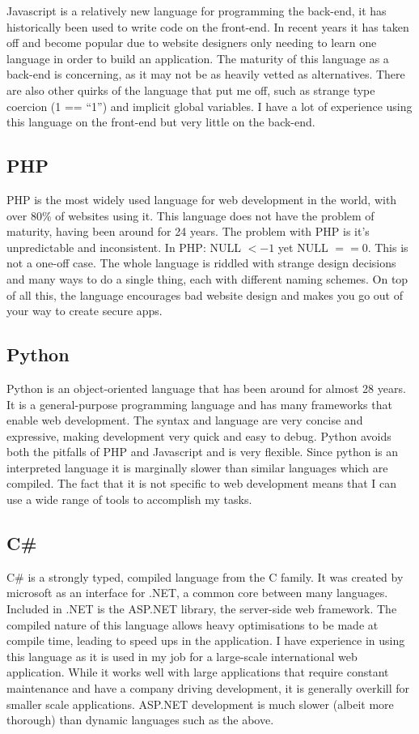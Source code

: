 \documentclass[a4paper,oneside,12pt,draft]{report}
\begin{document}
	Javascript is a relatively new language for programming the back-end, it has historically been used to write code on the front-end. In recent years it has taken off and become popular due to website designers only needing to learn one language in order to build an application. The maturity of this language as a back-end is concerning, as it may not be as heavily vetted as alternatives. There are also other quirks of the language that put me off, such as strange type coercion (1 == “1”) and implicit global variables. I have a lot of experience using this language on the front-end but very little on the back-end.

	\subsection{PHP}
	PHP is the most widely used language for web development in the world, with over 80\% of websites using it. This language does not have the problem of maturity, having been around for 24 years. The problem with PHP is it’s unpredictable and inconsistent. In PHP: NULL \(< -1\) yet NULL \(== 0\). This is not a one-off case. The whole language is riddled with strange design decisions and many ways to do a single thing, each with different naming schemes. On top of all this, the language encourages bad website design and makes you go out of your way to create secure apps.

	\subsection{Python}
	Python is an object-oriented language that has been around for almost 28 years. It is a general-purpose programming language and has many frameworks that enable web development. The syntax and language are very concise and expressive, making development very quick and easy to debug. Python avoids both the pitfalls of PHP and Javascript and is very flexible. Since python is an interpreted language it is marginally slower than similar languages which are compiled. The fact that it is not specific to web development means that I can use a wide range of tools to accomplish my tasks.
	
	\subsection{C\#}
	C\# is a strongly typed, compiled language from the C family. It was created by microsoft as an interface for .NET, a common core between many languages. Included in .NET is the ASP.NET library, the server-side web framework. The compiled nature of this language allows heavy optimisations to be made at compile time, leading to speed ups in the application. I have experience in using this language as it is used in my job for a large-scale international web application. While it works well with large applications that require constant maintenance and have a company driving development, it is generally overkill for smaller scale applications. ASP.NET development is much slower (albeit more thorough) than dynamic languages such as the above.
	
\end{document}
